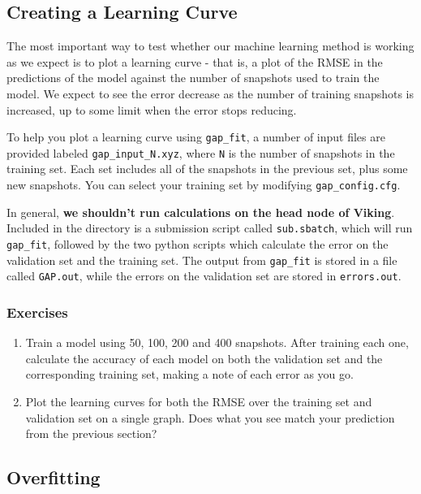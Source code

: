 \documentclass{article}
\begin{document}
\subsection{Creating a Learning Curve}

The most important way to test whether our machine learning method is working as we expect is to plot a learning curve - that is, a plot of the RMSE in the predictions of the model against the number of snapshots used to train the model. We expect to see the error decrease as the number of training snapshots is increased, up to some limit when the error stops reducing.

To help you plot a learning curve using \verb|gap_fit|, a number of input files are provided labeled \verb|gap_input_N.xyz|, where \verb|N| is the number of snapshots in the training set. Each set includes all of the snapshots in the previous set, plus some new snapshots. You can select your training set by modifying \verb|gap_config.cfg|.

In general, \textbf{we shouldn't run calculations on the head node of Viking}. Included in the directory is a submission script called \verb|sub.sbatch|, which will run \verb|gap_fit|, followed by the two python scripts which calculate the error on the validation set and the training set. The output from \verb|gap_fit| is stored in a file called \verb|GAP.out|, while the errors on the validation set are stored in \verb|errors.out|.

\subsubsection*{Exercises}

\begin{enumerate}

\item Train a model using 50, 100, 200 and 400 snapshots. After training each one, calculate the accuracy of each model on both the validation set and the corresponding training set, making a note of each error as you go.
\item Plot the learning curves for both the RMSE over the training set and validation set on a single graph. Does what you see match your prediction from the previous section?

\end{enumerate}

\subsection{Overfitting}
\end{document}
